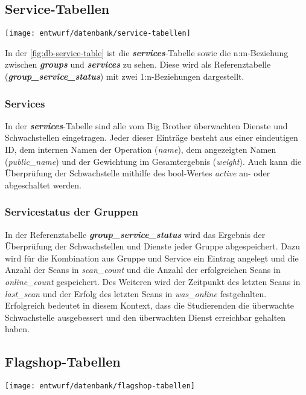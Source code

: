 \subsection{Service-Tabellen}
\begin{center}
	\texttt{[image: entwurf/datenbank/service-tabellen]}
	\label{fig:db-service-table}
\end{center}

In der \autoref{fig:db-service-table} ist die \textbf{\textit{services}}-Tabelle sowie die n:m-Beziehung zwischen \textbf{\textit{groups}} und \textbf{\textit{services}} zu sehen. Diese wird als Referenztabelle (\textbf{\textit{group\_service\_status}}) mit zwei 1:n-Beziehungen dargestellt.

\subsubsection{Services}
In der \textbf{\textit{services}}-Tabelle sind alle vom Big Brother überwachten Dienste und Schwachstellen eingetragen. Jeder dieser Einträge besteht aus einer eindeutigen ID, dem internen Namen der Operation (\textit{name}), dem angezeigten Namen (\textit{public\_name}) und der Gewichtung im Gesamtergebnis (\textit{weight}). Auch kann die Überprüfung der Schwachstelle mithilfe des bool-Wertes \textit{active} an- oder abgeschaltet werden.

\subsubsection{Servicestatus der Gruppen}
In der Referenztabelle \textbf{\textit{group\_service\_status}} wird das Ergebnis der Überprüfung der Schwachstellen und Dienste jeder Gruppe abgespeichert. Dazu wird für die Kombination aus Gruppe und Service ein Eintrag angelegt und die Anzahl der Scans in \textit{scan\_count} und die Anzahl der erfolgreichen Scans in \textit{online\_count} gespeichert. Des Weiteren wird der Zeitpunkt des letzten Scans in \textit{last\_scan} und der Erfolg des letzten Scans in \textit{was\_online} festgehalten. Erfolgreich bedeutet in diesem Kontext, dass die Studierenden die überwachte Schwachstelle ausgebessert und den überwachten Dienst erreichbar gehalten haben.

\subsection{Flagshop-Tabellen}
\begin{center}
	\texttt{[image: entwurf/datenbank/flagshop-tabellen]}
	\label{fig:db-flagshop-table}
\end{center}

